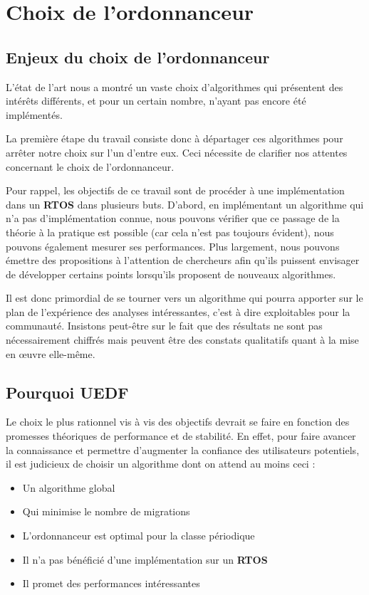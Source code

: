	\section{Choix de l'ordonnanceur}
	

	\subsection{Enjeux du choix de l'ordonnanceur}
	
	L'état de l'art nous a montré un vaste choix d'algorithmes qui présentent 
	des intérêts différents, et pour un certain nombre, 
	n'ayant pas encore été implémentés. \newline
	
	La première étape du travail consiste donc à départager ces algorithmes pour arrêter notre choix sur l'un d'entre eux. Ceci nécessite de clarifier nos attentes concernant le choix de l'ordonnanceur.\newline
	
	Pour rappel, les objectifs de ce travail sont de procéder à une implémentation dans 
	un \textbf{RTOS} dans plusieurs buts. 
	D'abord, en implémentant un algorithme qui n'a pas d'implémentation connue, nous 
	pouvons vérifier que ce passage de la théorie à la pratique est possible (car cela n'est pas 
	toujours évident), nous pouvons également mesurer ses performances. 
	Plus largement, nous pouvons émettre des propositions à l'attention de chercheurs 
	afin qu'ils puissent envisager de développer certains points lorsqu'ils proposent de nouveaux algorithmes. \newline
	
	Il est donc primordial de se tourner vers un algorithme qui pourra apporter sur le plan de 
	l'expérience des analyses intéressantes, c'est à dire exploitables pour la communauté. 
	Insistons peut-être sur le fait que des résultats ne sont pas nécessairement chiffrés mais 
	peuvent être des constats qualitatifs quant à la mise en œuvre elle-même.\newline
	
	\subsection{Pourquoi UEDF}
	
	Le choix le plus rationnel vis à vis des objectifs devrait se faire en fonction des 
	promesses théoriques de performance et de stabilité. 
	En effet, pour faire avancer la connaissance et permettre d'augmenter la confiance des utilisateurs 
	potentiels, il est judicieux de choisir un algorithme dont on attend au moins ceci :
	\begin{itemize}
		\setlength\itemsep{0.1em}
		\item Un algorithme global
		\item Qui minimise le nombre de migrations
		\item L'ordonnanceur est optimal pour la classe périodique
		\item Il n'a pas bénéficié d'une implémentation sur un \textbf{RTOS}
		\item Il promet des performances intéressantes
	\end{itemize}
	
